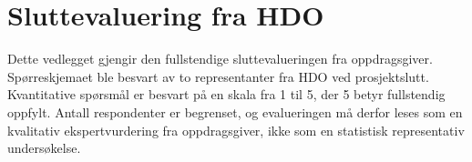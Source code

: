 \chapter{Sluttevaluering fra HDO}
\label{app:hdo-eval}


Dette vedlegget gjengir den fullstendige sluttevalueringen fra
oppdragsgiver. Spørreskjemaet ble besvart av to representanter
fra HDO ved prosjektslutt. Kvantitative spørsmål er besvart på en skala fra 1 til 5, der 5
betyr fullstendig oppfylt. Antall respondenter er
begrenset, og evalueringen må derfor leses som en kvalitativ
ekspertvurdering fra oppdragsgiver, ikke som en statistisk
representativ undersøkelse.

